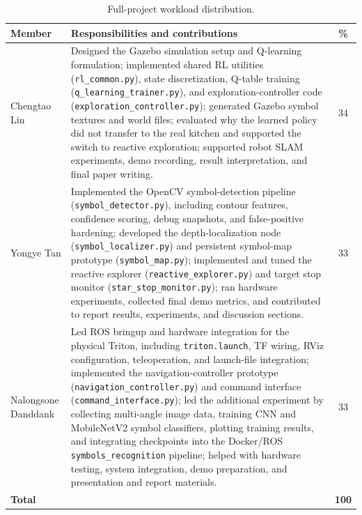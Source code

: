 \documentclass[letterpaper, 10 pt, conference]{ieeeconf/ieeeconf}
\begin{document}
\begin{table}[h]
\centering
\caption{Full-project workload distribution.}
\label{tab:workload}
\renewcommand{\arraystretch}{1.18}
\begin{tabular}{@{}p{1.7cm} p{5.1cm} c@{}}
\toprule
\textbf{Member} & \textbf{Responsibilities and contributions} & \textbf{\%} \\
\midrule
Chengtao Lin
  & Designed the Gazebo simulation setup and Q-learning formulation;
    implemented shared RL utilities (\texttt{rl\_common.py}),
    state discretization, Q-table training
    (\texttt{q\_learning\_trainer.py}), and exploration-controller code
    (\texttt{exploration\_controller.py});
    generated Gazebo symbol textures and world files;
    evaluated why the learned policy did not transfer to the real kitchen
    and supported the switch to reactive exploration;
    supported robot SLAM experiments, demo recording, result
    interpretation, and final paper writing.
  & 34 \\[2pt]
Yongye Tan
  & Implemented the OpenCV symbol-detection pipeline
    (\texttt{symbol\_detector.py}), including contour features, confidence
    scoring, debug snapshots, and false-positive hardening;
    developed the depth-localization node (\texttt{symbol\_localizer.py})
    and persistent symbol-map prototype (\texttt{symbol\_map.py});
    implemented and tuned the reactive explorer
    (\texttt{reactive\_explorer.py}) and target stop monitor
    (\texttt{star\_stop\_monitor.py});
    ran hardware experiments, collected final demo metrics, and contributed
    to report results, experiments, and discussion sections.
  & 33 \\[2pt]
Nalongsone Danddank
  & Led ROS bringup and hardware integration for the physical Triton,
    including \texttt{triton.launch}, TF wiring, RViz configuration,
    teleoperation, and launch-file integration;
    implemented the navigation-controller prototype
    (\texttt{navigation\_controller.py}) and command interface
    (\texttt{command\_interface.py});
    led the additional experiment by collecting multi-angle image data,
    training CNN and MobileNetV2 symbol classifiers, plotting training
    results, and integrating checkpoints into the Docker/ROS
    \texttt{symbols\_recognition} pipeline;
    helped with hardware testing, system integration, demo preparation,
    and presentation and report materials.
  & 33 \\
\midrule
\textbf{Total} & & \textbf{100} \\
\bottomrule
\end{tabular}
\end{table}
\end{document}
